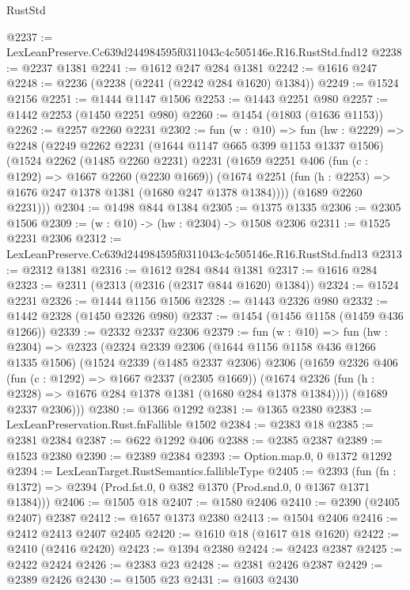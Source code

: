 \begin{lexlean}{RustStd}
\begin{coremodule}
@2237 := LexLeanPreserve.Cc639d244984595f0311043c4c505146e.R16.RustStd.fnd12
@2238 := @2237 @1381
@2241 := @1612 @247 @284 @1381
@2242 := @1616 @247
@2248 := @2236 (@2238 (@2241 (@2242 @284 @1620) @1384))
@2249 := @1524 @2156
@2251 := @1444 @1147 @1506
@2253 := @1443 @2251 @980
@2257 := @1442 @2253 (@1450 @2251 @980)
@2260 := @1454 (@1803 (@1636 @1153))
@2262 := @2257 @2260 @2231
@2302 := fun (w : @10) =>
  fun (hw : @2229) =>
  @2248
    (@2249
      @2262
      @2231
      (@1644 @1147 @665 @399 @1153 @1337 @1506)
      (@1524
        @2262
        (@1485 @2260 @2231)
        @2231
        (@1659
          @2251
          @406
          (fun (c : @1292) => @1667 @2260 (@2230 @1669))
          (@1674 @2251 (fun (h : @2253) => @1676 @247 @1378 @1381 (@1680 @247 @1378 @1384))))
        (@1689 @2260 @2231)))
@2304 := @1498 @844 @1384
@2305 := @1375 @1335
@2306 := @2305 @1506
@2309 := (w : @10) -> (hw : @2304) -> @1508 @2306
@2311 := @1525 @2231 @2306
@2312 := LexLeanPreserve.Cc639d244984595f0311043c4c505146e.R16.RustStd.fnd13
@2313 := @2312 @1381
@2316 := @1612 @284 @844 @1381
@2317 := @1616 @284
@2323 := @2311 (@2313 (@2316 (@2317 @844 @1620) @1384))
@2324 := @1524 @2231
@2326 := @1444 @1156 @1506
@2328 := @1443 @2326 @980
@2332 := @1442 @2328 (@1450 @2326 @980)
@2337 := @1454 (@1456 @1158 (@1459 @436 @1266))
@2339 := @2332 @2337 @2306
@2379 := fun (w : @10) =>
  fun (hw : @2304) =>
  @2323
    (@2324
      @2339
      @2306
      (@1644 @1156 @1158 @436 @1266 @1335 @1506)
      (@1524
        @2339
        (@1485 @2337 @2306)
        @2306
        (@1659
          @2326
          @406
          (fun (c : @1292) => @1667 @2337 (@2305 @1669))
          (@1674 @2326 (fun (h : @2328) => @1676 @284 @1378 @1381 (@1680 @284 @1378 @1384))))
        (@1689 @2337 @2306)))
@2380 := @1366 @1292
@2381 := @1365 @2380
@2383 := LexLeanPreservation.Rust.fnFallible @1502
@2384 := @2383 @18
@2385 := @2381 @2384
@2387 := @622 @1292 @406
@2388 := @2385 @2387
@2389 := @1523 @2380
@2390 := @2389 @2384
@2393 := Option.map.{0, 0} @1372 @1292
@2394 := LexLeanTarget.RustSemantics.fallibleType
@2405 := @2393
    (fun (fn : @1372) => @2394 (Prod.fst.{0, 0} @382 @1370 (Prod.snd.{0, 0} @1367 @1371 @1384)))
@2406 := @1505 @18
@2407 := @1580 @2406
@2410 := @2390 (@2405 @2407) @2387
@2412 := @1657 @1373 @2380
@2413 := @1504 @2406
@2416 := @2412 @2413 @2407 @2405
@2420 := @1610 @18 (@1617 @18 @1620)
@2422 := @2410 (@2416 @2420)
@2423 := @1394 @2380
@2424 := @2423 @2387
@2425 := @2422 @2424
@2426 := @2383 @23
@2428 := @2381 @2426 @2387
@2429 := @2389 @2426
@2430 := @1505 @23
@2431 := @1603 @2430

\end{coremodule}
\end{lexlean}
